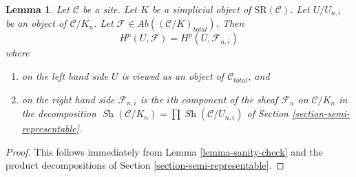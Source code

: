 \documentclass{stacks-project}
\theoremstyle{plain}
\newtheorem{lemma}[subsection]{Lemma}
\theoremstyle{definition}
\theoremstyle{remark}
\numberwithin{equation}{subsection}
\def\Sh{\mathop{\mathit{Sh}}\nolimits}
\begin{document}
\begin{lemma}
\label{lemma-sanity-check-simplicial-semi-representable}
Let $\mathcal{C}$ be a site. Let $K$ be a simplicial object of
$\text{SR}(\mathcal{C})$. Let $U/U_{n, i}$ be an object of
$\mathcal{C}/K_n$. Let
$\mathcal{F} \in \textit{Ab}((\mathcal{C}/K)_{total})$.
Then
$$
H^p(U, \mathcal{F}) = H^p(U, \mathcal{F}_{n, i})
$$
where
\begin{enumerate}
\item on the left hand side $U$ is viewed as an object of
$\mathcal{C}_{total}$, and
\item on the right hand side $\mathcal{F}_{n, i}$ is the $i$th
component of the sheaf $\mathcal{F}_n$ on $\mathcal{C}/K_n$
in the decomposition $\Sh(\mathcal{C}/K_n) = \prod \Sh(\mathcal{C}/U_{n, i})$
of Section \ref{section-semi-representable}.
\end{enumerate}
\end{lemma}

\begin{proof}
This follows immediately from Lemma \ref{lemma-sanity-check}
and the product decompositions of Section \ref{section-semi-representable}.
\end{proof}
\end{document}
